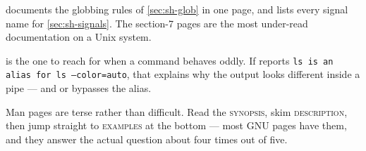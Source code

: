 \begin{eg}
	 documents the globbing rules of \autoref{sec:sh-glob} in one
	page, and  lists every signal name for
	\autoref{sec:sh-signals}. The section-7 pages are the most under-read
	documentation on a Unix system.
\end{eg}

\begin{note}
	 is the one to reach for when a command behaves oddly. If
	 reports \texttt{ls is an alias for ls --color=auto}, that
	explains why the output looks different inside a pipe --- and 
	or  bypasses the alias.
\end{note}

\begin{moral}
	Man pages are terse rather than difficult. Read the \textsc{synopsis}, skim
	\textsc{description}, then jump straight to \textsc{examples} at the bottom ---
	most GNU pages have them, and they answer the actual question about four times
	out of five.
\end{moral}
